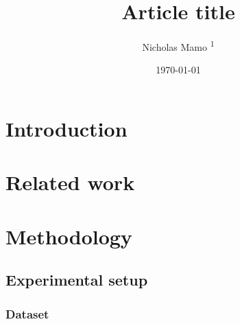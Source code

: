 \documentclass[twocolumn]{elegantarticle}
\title{Article title}
\author{Nicholas Mamo \textsuperscript{1}}
\affiliation{\textsuperscript{1} University of Malta, Msida, Malta}
\date{\today}
\begin{document}
	\maketitle
	
	\section{Introduction}
	
		\lipsum[1-3]
	
	\section{Related work}
	
		\lipsum[4-8]
		
	\section{Methodology}
	
		\lipsum[9]
		
		\subsection{Experimental setup}
		
			\lipsum[10]
			
			\subsubsection{Dataset}
			
				\lipsum[11]
\end{document}
